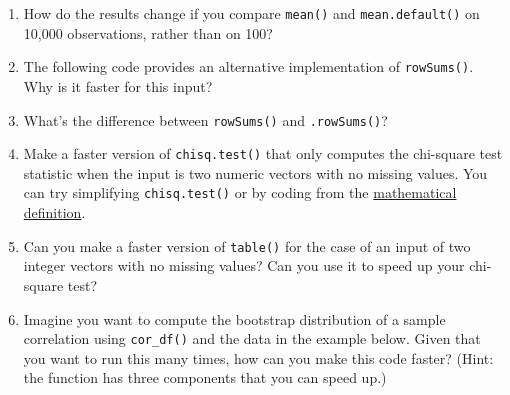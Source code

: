 \begin{enumerate}
\def\labelenumi{\arabic{enumi}.}
\item
  How do the results change if you compare \texttt{mean()} and
  \texttt{mean.default()} on 10,000 observations, rather than on 100?
\item
  The following code provides an alternative implementation of
  \texttt{rowSums()}. Why is it faster for this input?

\begin{Shaded}
\begin{Highlighting}[]
\StringTok{ }
  \StringTok{ }
  \StringTok{ }\NormalTok{) }

  \NormalTok{:}
    \StringTok{ }\StringTok{ }
  \NormalTok{\}}
\NormalTok{\}}

\StringTok{ }\NormalTok{(}
  \NormalTok{(}\NormalTok{, }\NormalTok{(}\NormalTok{, }\NormalTok{, } \NormalTok{))}
\NormalTok{)}
\NormalTok{(}
\NormalTok{(}
\end{Highlighting}
\end{Shaded}
\item
  What's the difference between \texttt{rowSums()} and
  \texttt{.rowSums()}?
\item
  Make a faster version of \texttt{chisq.test()} that only computes the
  chi-square test statistic when the input is two numeric vectors with
  no missing values. You can try simplifying \texttt{chisq.test()} or by
  coding from the
  \href{http://en.wikipedia.org/wiki/Pearson\%27s_chi-squared_test}{mathematical
  definition}.
\item
  Can you make a faster version of \texttt{table()} for the case of an
  input of two integer vectors with no missing values? Can you use it to
  speed up your chi-square test?
\item
  Imagine you want to compute the bootstrap distribution of a sample
  correlation using \texttt{cor\_df()} and the data in the example
  below. Given that you want to run this many times, how can you make
  this code faster? (Hint: the function has three components that you
  can speed up.)


\end{enumerate}
